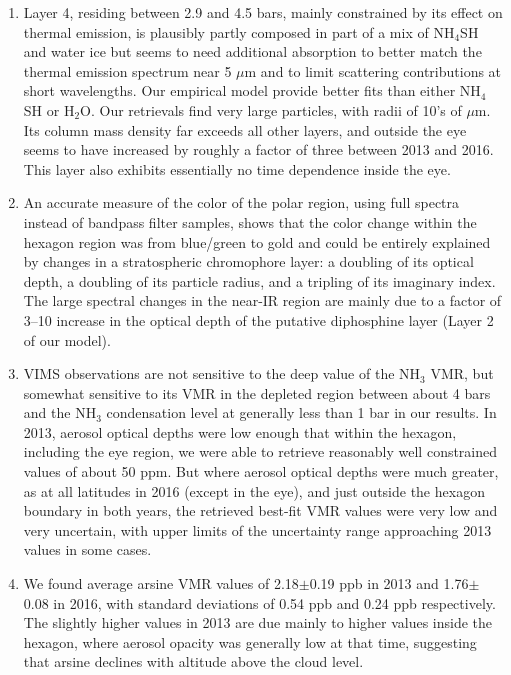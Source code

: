 \documentclass[article,11pt]{emulateapj}
\def\htox{H$_2$O}
\def\mum{$\mu$m }
\def\mumx{$\mu$m}
\def\htox{H$_2$O}
\def\nht{NH$_3$ }
\def\nhfsh{NH$_4$SH }
\begin{document}
\begin{enumerate}
\item Layer 4, residing between 2.9 and 4.5 bars, mainly constrained
  by its effect on thermal emission, is plausibly partly composed in part of
  a mix of \nhfsh and water ice but seems to need additional absorption
  to better match the thermal emission spectrum near 5 \mum and to
  limit scattering contributions at short wavelengths. Our
empirical model provide better fits than either \nhfsh or \htox. Our retrievals
find very large particles, with radii of 10's of \mumx. Its column
mass density far exceeds all other layers, and outside the eye seems to have
increased by roughly a factor of three between 2013 and 2016.  This
layer also exhibits essentially no time dependence inside the eye.

\item An accurate measure of the color of the polar region, using full
  spectra instead of bandpass filter samples, shows that the color
  change within the hexagon region was from blue/green to gold and
  could be entirely explained by changes in a stratospheric
  chromophore layer: a doubling of its optical depth, a doubling of its
  particle radius, and a tripling of its imaginary index.  The large
  spectral changes in the near-IR region are mainly due to a factor of
  3--10 increase in the optical depth of the putative diphosphine
  layer (Layer 2 of our model).

\item VIMS observations are not sensitive to
the deep value of the \nht VMR, but somewhat sensitive to
its VMR in the depleted region between about 4 bars
and the \nht condensation level at generally less than 1 bar in our
results.  In 2013, aerosol optical depths were low enough that
within the hexagon, including the eye region,
 we were able to retrieve reasonably well constrained
values of about 50 ppm.  But where aerosol optical depths were much
greater, as at all latitudes in 2016 (except in the eye),
and just outside the hexagon boundary in both years, the retrieved 
best-fit VMR values were very low and very uncertain, with upper
limits of the uncertainty range approaching 2013 values in some cases.

\item We found average arsine VMR values of 2.18$\pm$0.19 ppb in 2013
  and 1.76$\pm$0.08 in 2016, with standard deviations of 0.54 ppb and
  0.24 ppb respectively.  The slightly higher values in 2013 are due
  mainly to higher values inside the hexagon, where aerosol opacity
  was generally low at that time, suggesting that arsine declines with
  altitude above the cloud level.


\end{enumerate}
\end{document}

